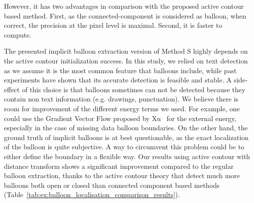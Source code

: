 However, it has two advantages in comparison with the proposed active contour based method.
First, as the connected-component is considered as balloon, when correct, the precision at the pixel level is maximal.
Second, it is faster to compute.

The presented implicit balloon extraction version of Method S highly depends on the active contour initialization success.
In this study, we relied on text detection as we assume it is the most common feature that balloons include, while past experiments have shown that its accurate detection is feasible and stable.
A side-effect of this choice is that balloons sometimes can not be detected because they contain non text information (e.g. drawings, punctuation).
We believe there is room for improvement of the different energy terms we used.
For example, one could use the Gradient Vector Flow proposed by Xu~\cite{Xu1998} for the external energy, especially in the case of missing data balloon boundaries.
On the other hand, the ground truth of implicit balloons is at best questionable, as the exact localization of the balloon is quite subjective.
A way to circumvent this problem could be to either define the boundary in a flexible way.
Our results using active contour with distance transform shows a significant improvement compared to the regular balloon extraction, thanks to the active contour theory that detect much more balloons both open or closed than connected component based methods (Table~\ref{tab:ex:balloon_localisation_comparison_results}).





